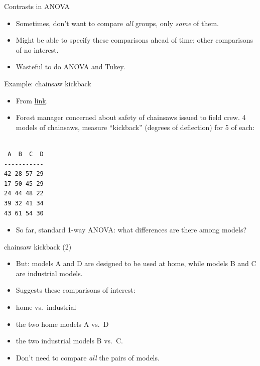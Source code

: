 \documentclass[ignorenonframetext,]{beamer}
\providecommand{\tightlist}{%
  \setlength{\itemsep}{0pt}\setlength{\parskip}{0pt}}
\begin{document}
\begin{frame}{Contrasts in ANOVA}
\protect\hypertarget{contrasts-in-anova}{}

\begin{itemize}
\item
  Sometimes, don't want to compare \emph{all} groups, only \emph{some}
  of them.
\item
  Might be able to specify these comparisons ahead of time; other
  comparisons of no interest.
\item
  Wasteful to do ANOVA and Tukey.
\end{itemize}

\end{frame}

\begin{frame}[fragile]{Example: chainsaw kickback}
\protect\hypertarget{example-chainsaw-kickback}{}

\begin{itemize}
\item
  From
  \href{http://www.ohio.edu/plantbio/staff/mccarthy/quantmet/lectures/ANOVA2.pdf}{link}.
\item
  Forest manager concerned about safety of chainsaws issued to field
  crew. 4 models of chainsaws, measure ``kickback'' (degrees of
  deflection) for 5 of each:
\end{itemize}

\begin{verbatim}

 A  B  C  D
-----------
42 28 57 29
17 50 45 29
24 44 48 22
39 32 41 34
43 61 54 30
\end{verbatim}

\begin{itemize}
\tightlist
\item
  So far, standard 1-way ANOVA: what differences are there among models?
\end{itemize}

\end{frame}

\begin{frame}{chainsaw kickback (2)}
\protect\hypertarget{chainsaw-kickback-2}{}

\begin{itemize}
\item
  But: models A and D are designed to be used at home, while models B
  and C are industrial models.
\item
  Suggests these comparisons of interest:
\item
  home vs.~industrial
\item
  the two home models A vs.~D
\item
  the two industrial models B vs.~C.
\item
  Don't need to compare \emph{all} the pairs of models.
\end{itemize}

\end{frame}
\end{document}
